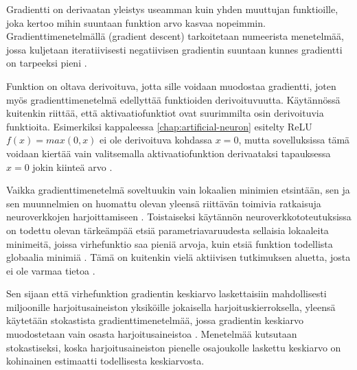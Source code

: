 \documentclass[finnish]{tktltiki2}
\theoremstyle{definition}
\theoremstyle{remark}
\begin{document}
    Gradientti on derivaatan yleistys useamman kuin yhden muuttujan funktioille, joka kertoo mihin suuntaan funktion arvo kasvaa nopeimmin. Gradienttimenetelmällä (gradient descent) tarkoitetaan numeerista menetelmää, jossa kuljetaan iteratiivisesti negatiivisen gradientin suuntaan kunnes gradientti on tarpeeksi pieni \cite{Rumelhart-1986-back-prop}. 

    Funktion on oltava derivoituva, jotta sille voidaan muodostaa gradientti, joten myös gradienttimenetelmä edellyttää funktioiden derivoituvuutta. Käytännössä kuitenkin riittää, että aktivaatiofunktiot ovat suurimmilta osin derivoituvia funktioita. 
    Esimerkiksi kappaleessa \ref{chap:artificial-neuron} esitelty ReLU $f(x) = max(0, x)$ ei ole derivoituva kohdassa $x = 0$, mutta sovelluksissa tämä voidaan kiertää vain valitsemalla aktivaatiofunktion derivaataksi tapauksessa $x=0$ jokin kiinteä arvo \cite{Goodfellow-et-al-2016}.
    

    Vaikka gradienttimenetelmä soveltuukin vain lokaalien minimien etsintään, sen ja sen muunnelmien on huomattu olevan yleensä riittävän toimivia ratkaisuja neuroverkkojen harjoittamiseen \cite{Rumelhart-1986-back-prop}\cite{Goodfellow-et-al-2016}. Toistaiseksi käytännön neuroverkkototeutuksissa on todettu olevan tärkeämpää etsiä parametriavaruudesta sellaisia lokaaleita minimeitä, joissa virhefunktio saa pieniä arvoja, kuin etsiä funktion todellista globaalia minimiä \cite{neural-optimization-goodfellow-2015}. Tämä on kuitenkin vielä aktiivisen tutkimuksen aluetta, josta ei ole varmaa tietoa \cite{Goodfellow-et-al-2016}.

    Sen sijaan että virhefunktion gradientin keskiarvo laskettaisiin mahdollisesti miljoonille harjoitusaineiston yksiköille jokaisella harjoituskierroksella, yleensä käytetään stokastista gradienttimenetelmää, jossa gradientin keskiarvo muodostetaan vain osasta harjoitusaineistoa \cite{nature-lecun15}. Menetelmää kutsutaan stokastiseksi, koska harjoitusaineiston pienelle osajoukolle laskettu keskiarvo on kohinainen estimaatti todellisesta keskiarvosta.
\end{document}
